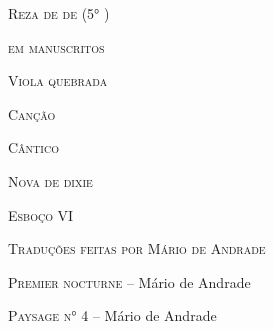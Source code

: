 
\textsc{Reza de de} \textsc{(5° )}

\textsc{em manuscritos}

\textsc{Viola quebrada}

\textsc{Canção }

\textsc{Cântico}

\textsc{Nova de dixie}

\textsc{Esboço VI}

\textsc{Traduções feitas por Mário de Andrade}

\textsc{Premier nocturne} -- Mário de Andrade

\textsc{Paysage n° 4} -- Mário de Andrade
